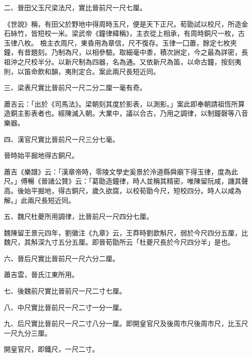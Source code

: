 \begin{pinyinscope}
 二、晉田父玉尺梁法尺，實比晉前尺一尺七厘。



 《世說》稱，有田父於野地中得周時玉尺，便是天下正尺。荀勖試以校尺，所造金石絲竹，皆短校一米。梁武帝《鐘律緯稱》，主衣從上相承，有周時銅尺一枚，古玉律八枚。
 檢主衣周尺，東昏用為章信，尺不復存。玉律一囗蕭，餘定七枚夾鐘，有昔題刻。乃制為尺，以相參驗。取細毫中黍，積次詶定，今之最為詳密，長祖沖之尺校半分。以新尺制為四器，名為通。又依新尺為笛，以命古鐘，按刻夷則，以笛命飲和韻，夷則定合。案此兩尺長短近同。



 三、梁表尺實比晉前尺一尺二分二厘一毫有奇。



 蕭吉云：「出於《司馬法》。梁朝刻其度於影表，以測影。」案此即奉朝請祖恆所算造銅主影表者也。經陳滅入朝。大業中，議以合古，乃用之調律，以制鐘磬等八音樂器。



 四、漢官尺實比晉前尺一尺三分七毫。



 晉時始平掘地得古銅尺。



 蕭吉《樂譜》云：「漢章帝時，零陵文學史奚景於泠道縣舜廟下得玉律，度為此尺。」傅暢《晉諸公贊》云：「葛勖造鐘律，時人並稱其精密，唯陳留阮咸，譏其聲高。後始平掘地，得古銅尺，歲久欲腐，以校荀勖今尺，短校四分。時人以咸為解。」此兩尺長短近同。



 五、魏尺杜夔所用調律，比晉前尺一尺四分七厘。



 魏陳留王景元四年，劉徽注《九章》云，王莽時劉歆斛尺，弱於今尺四分五厘，比魏尺，其斛深九寸五分五厘。即晉荀勖所云「杜夔尺長於今尺四分半」是也。



 六、晉后尺實比晉前尺一尺六分二厘。



 蕭吉雲，晉氏江東所用。



 七、後魏前尺實比晉前尺一尺二寸七厘。



 八、中尺實比晉前尺一尺二寸一分一厘。



 九、后尺實比晉前尺一尺二寸八分一厘。即開皇官尺及後周市尺後周市尺，比玉尺一尺九分三厘。



 開皇官尺，即鐵尺，一尺二寸。




\end{pinyinscope}

